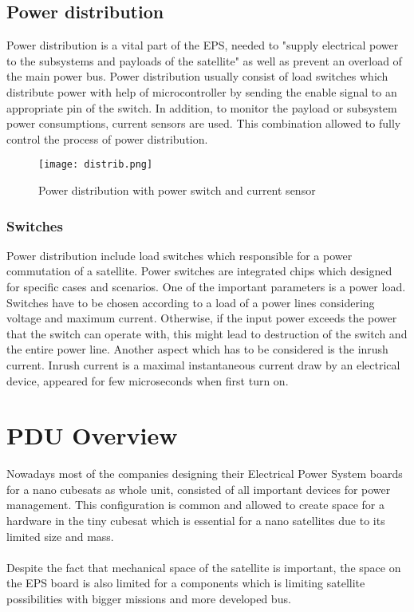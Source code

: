 \subsection{Power distribution \label{sec:tech}}

Power distribution is a vital part of the EPS, needed to \cite{21} "supply electrical power to the subsystems and payloads of the satellite" as well as prevent an overload of the main power bus. Power distribution usually consist of load switches which distribute power with help of microcontroller by sending the enable signal to an appropriate pin of the switch. In addition, to monitor the payload or subsystem power consumptions, current sensors are used. This combination allowed to fully control the process of power distribution.


\begin{figure}[h]
	\centering
	\texttt{[image: distrib.png]}
	\caption{Power distribution with power switch and current sensor}
	\label{fig: EPS}
\end{figure}

\newpage

\subsubsection{Switches}
Power distribution include load switches which responsible for a power commutation of a satellite. Power switches are integrated chips which designed for specific cases and scenarios. One of the important parameters is a power load. Switches have to be chosen according to a load of a power lines considering voltage and maximum current. Otherwise, if the input power exceeds the power that the switch can operate with, this might lead to destruction of the switch and the entire power line.  Another aspect which has to be considered is the inrush current. Inrush current is a maximal instantaneous current draw by an electrical device, appeared for few microseconds when first turn on. 

\section{PDU Overview \label{sec:tech}}
Nowadays most of the companies designing their Electrical Power System boards for a nano cubesats as whole unit, consisted of all important devices for power management. This configuration is common and allowed to create space for a hardware in the tiny cubesat which is essential for a nano satellites due to its limited size and mass. 
\\ \\ Despite the fact that mechanical space of the satellite is important, the space on the EPS board is also limited for a components which is limiting satellite possibilities with bigger missions and more developed bus.  

